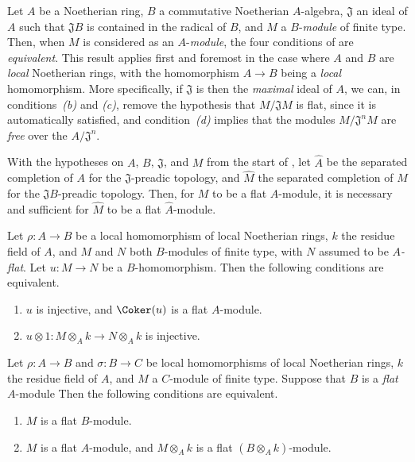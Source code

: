 \begin{env}[10.2.2]
\label{0.10.2.2}
Let $A$ be a Noetherian ring, $B$ a commutative Noetherian $A$-algebra, $\mathfrak{J}$ an ideal of $A$ such that $\mathfrak{J}B$ is contained in the radical of $B$, and $M$ a $B$-\emph{module} of finite type.
Then, when $M$ is considered as an $A$-\emph{module}, the four conditions of  are \emph{equivalent}.
This result applies first and foremost in the case where $A$ and $B$ are \emph{local} Noetherian rings, with the homomorphism $A\to B$ being a \emph{local} homomorphism.
More specifically, if $\mathfrak{J}$ is then the \emph{maximal} ideal of $A$, we can, in conditions~\emph{(b)} and \emph{(c)}, remove the hypothesis that $M/\mathfrak{J}M$ is flat, since it is automatically satisfied, and condition~\emph{(d)} implies that the modules $M/\mathfrak{J}^nM$ are \emph{free} over the $A/\mathfrak{J}^n$.
\end{env}

\begin{env}[10.2.3]
\label{0.10.2.3}
With the hypotheses on $A$, $B$, $\mathfrak{J}$, and $M$ from the start of , let $\widehat{A}$ be the separated completion of $A$ for the $\mathfrak{J}$-preadic topology, and $\widehat{M}$ the separated completion of $M$ for the $\mathfrak{J}B$-preadic topology.
Then, for $M$ to be a flat $A$-module, it is necessary and sufficient for $\widehat{M}$ to be a flat $\widehat{A}$-module.
\end{env}

\begin{env}[10.2.4]
\label{0.10.2.4}
Let $\rho:A\to B$ be a local homomorphism of local Noetherian rings, $k$ the residue field of $A$, and $M$ and $N$ both $B$-modules of finite type, with $N$ assumed to be \emph{$A$-flat}.
Let $u:M\to N$ be a $B$-homomorphism.
Then the following conditions are equivalent.
\begin{enumerate}
  \item[(a)] $u$ is injective, and $\Coker(u)$ is a flat $A$-module.
  \item[(b)] $u\otimes1:M\otimes_A k\to N\otimes_A k$ is injective.
\end{enumerate}
\end{env}

\begin{env}[10.2.5]
\label{0.10.2.5}
Let $\rho:A\to B$ and $\sigma:B\to C$ be local homomorphisms of local Noetherian rings, $k$ the residue field of $A$, and $M$ a $C$-module of finite type.
Suppose that $B$ is a \emph{flat} $A$-module
Then the following conditions are equivalent.
\begin{enumerate}
  \item[(a)] $M$ is a flat $B$-module.
  \item[(b)] $M$ is a flat $A$-module, and $M\otimes_A k$ is a flat $(B\otimes_A k)$-module.
\end{enumerate}
\end{env}

